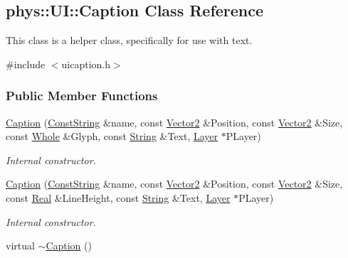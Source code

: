 \hypertarget{classphys_1_1UI_1_1Caption}{
\subsection{phys::UI::Caption Class Reference}
\label{d4/dfe/classphys_1_1UI_1_1Caption}
}


This class is a helper class, specifically for use with text.  




{\ttfamily \#include $<$uicaption.h$>$}

\subsubsection*{Public Member Functions}
\begin{DoxyCompactItemize}
\item 
\hyperlink{classphys_1_1UI_1_1Caption_a49873b9d0e566c95dc4c823a1c409e93}{Caption} (\hyperlink{namespacephys_a5ce5049f8b4bf88d6413c47b504ebb31}{ConstString} \&name, const \hyperlink{classphys_1_1Vector2}{Vector2} \&Position, const \hyperlink{classphys_1_1Vector2}{Vector2} \&Size, const \hyperlink{namespacephys_a460f6bc24c8dd347b05e0366ae34f34a}{Whole} \&Glyph, const \hyperlink{namespacephys_aa03900411993de7fbfec4789bc1d392e}{String} \&Text, \hyperlink{classphys_1_1UI_1_1Layer}{Layer} $\ast$PLayer)
\begin{DoxyCompactList}\small\item\em Internal constructor. \item\end{DoxyCompactList}\item 
\hyperlink{classphys_1_1UI_1_1Caption_a427d4ac90877112b2dbf262f7d384d77}{Caption} (\hyperlink{namespacephys_a5ce5049f8b4bf88d6413c47b504ebb31}{ConstString} \&name, const \hyperlink{classphys_1_1Vector2}{Vector2} \&Position, const \hyperlink{classphys_1_1Vector2}{Vector2} \&Size, const \hyperlink{namespacephys_af7eb897198d265b8e868f45240230d5f}{Real} \&LineHeight, const \hyperlink{namespacephys_aa03900411993de7fbfec4789bc1d392e}{String} \&Text, \hyperlink{classphys_1_1UI_1_1Layer}{Layer} $\ast$PLayer)
\begin{DoxyCompactList}\small\item\em Internal constructor. \item\end{DoxyCompactList}\item 
\hypertarget{classphys_1_1UI_1_1Caption_a5443ce0c7c7dc4b4f1c56b124e092a98}{
virtual \hyperlink{classphys_1_1UI_1_1Caption_a5443ce0c7c7dc4b4f1c56b124e092a98}{$\sim$Caption} ()}
\label{d4/dfe/classphys_1_1UI_1_1Caption_a5443ce0c7c7dc4b4f1c56b124e092a98}


\end{DoxyCompactItemize}
